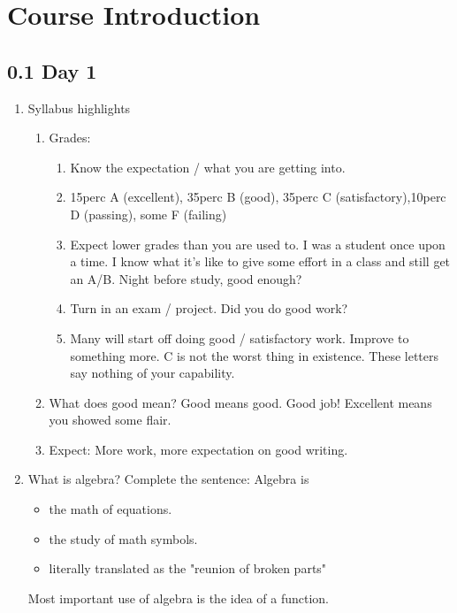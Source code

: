 \documentclass{article}
\begin{document}
\section{Course Introduction}

\subsection{0.1 Day 1}

\begin{enumerate}

\item Syllabus highlights
\begin{enumerate}
\item Grades: 
\begin{enumerate}
\item Know the expectation / what you are getting into.
\item 15perc A (excellent), 35perc B (good), 35perc C (satisfactory),10perc D (passing), some F (failing)
\item Expect lower grades than you are used to. I was a student once upon a time. I know what it's like to give some effort in a class and still get an A/B. Night before study, good enough? 
\item Turn in an exam / project. Did you do good work?
\item Many will start off doing good / satisfactory work. Improve to something more. C is not the worst thing in existence. These letters say nothing of your capability. 
\end{enumerate}
\item What does good mean? Good means good. Good job! Excellent means you showed some flair.
\item Expect: More work, more expectation on good writing.
\end{enumerate}


\item What is algebra? Complete the sentence: Algebra is
\begin{itemize}
\item the math of equations.
\item the study of math symbols.
\item literally translated as the "reunion of broken parts"
\end{itemize}
Most important use of algebra is the idea of a function.


\end{enumerate}
\end{document}
